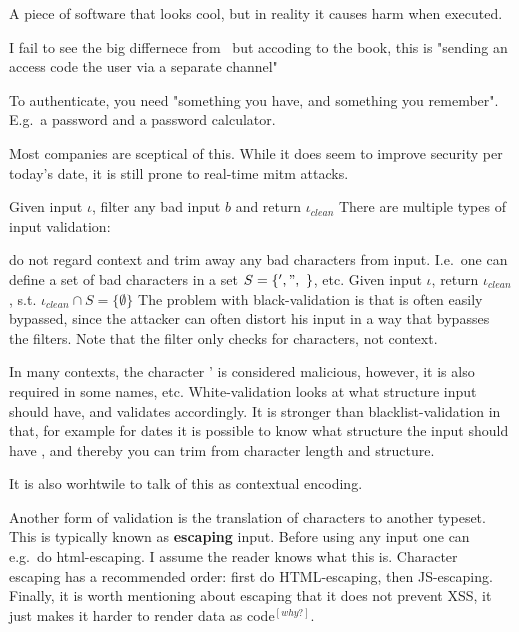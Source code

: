 \begin{definition}[Trojan]
	A piece of software that looks cool, but in reality it causes harm
	when executed.
\end{definition}

\begin{definition}
    I fail to see the big differnece from~
	but accoding to the book, this is "sending an access code the user
	via a separate channel"
\end{definition}

\begin{definition}\label{twofactor}
	To authenticate, you need "something you have, and something you remember".
	E.g.\ a password and a password calculator.

	Most companies are sceptical of this. While it does seem to improve
	security per today's date, it is still prone to real-time mitm attacks.
\end{definition}


\begin{definition}\label{validation}
	Given input $\iota$, filter any bad input $b$ and return $\iota_{clean}$
	There are multiple types of input validation:
	\begin{description}[labelindent=1cm]
		\item[Blacklist-validation] do not regard context and trim away any bad 
			characters from input. 
			I.e.\ one can define a set of bad characters in a set
			$S = \{ ' , " , \ \}$, etc. Given input $\iota$, return 
			$\iota_{clean}$, s.t. $\iota_{clean} \cap S = \{\emptyset\}$
			The problem with black-validation is that is often easily bypassed,
			since the attacker can often distort his input in a way that bypasses
			the filters. Note that the filter only checks for characters, not context.
		\item[Whitelist-validation]
			In many contexts, the character ' is considered malicious, however,
			it is also required in some names, etc. White-validation looks
			at what structure input should have, and validates accordingly.
			It is stronger than blacklist-validation in that, for example 
			for dates it is possible to know what structure the input should have
			, and thereby you can trim from character length and structure.

			It is also worhtwile to talk of this as contextual encoding.
	\end{description}
	
	Another form of validation is the translation of characters to another typeset.
	This is typically known as \textbf{escaping} input. Before using any
	input one can e.g.\ do html-escaping. I assume the reader knows what this is.
	Character escaping has a recommended order: first do HTML-escaping, then
	JS-escaping. Finally, it is worth mentioning about escaping that it 
	does not prevent XSS, it just makes it harder to render data as code$^{[why?]}$.
\end{definition}

